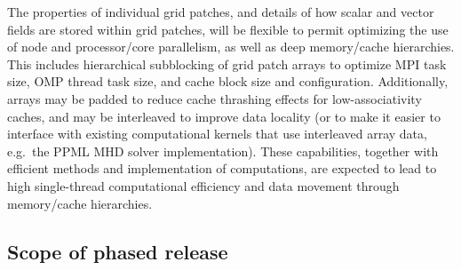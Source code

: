 \documentclass[11pt]{article}
\begin{document}

    The properties of individual grid patches, and details of how
    scalar and vector fields are stored within grid patches, will be
    flexible to permit optimizing the use of node and processor/core
    parallelism, as well as deep memory/cache hierarchies.  This
    includes hierarchical subblocking of grid patch arrays to optimize
    MPI task size, OMP thread task size, and cache block size and
    configuration.  Additionally, arrays may be padded to reduce cache
    thrashing effects for low-associativity caches, and may be
    interleaved to improve data locality (or to make it easier to
    interface with existing computational kernels that use interleaved
    array data, e.g.~the PPML MHD solver implementation).  These
    capabilities, together with efficient methods and implementation
    of computations, are expected to lead to high single-thread
    computational efficiency and data movement through memory/cache
    hierarchies.





\subsection{Scope of phased release}


\end{document}
